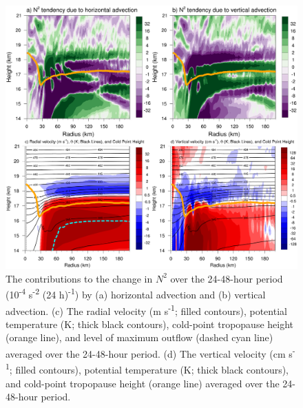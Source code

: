 \documentclass{ametsoc}
\begin{document}
\begin{figure}[ht]
\centerline{\includegraphics[width=39pc]{h024-h048-adv.png}}
\caption{The contributions to the change in $N^2$ over the 24-48-hour period (10\textsuperscript{-4} s\textsuperscript{-2} (24 h)\textsuperscript{-1}) by (a) horizontal advection and (b) vertical advection. (c) The radial velocity (m s\textsuperscript{-1}; filled contours), potential temperature (K; thick black contours), cold-point tropopause height (orange line), and level of maximum outflow (dashed cyan line) averaged over the 24-48-hour period. (d) The vertical velocity (cm s\textsuperscript{-1}; filled contours), potential temperature (K; thick black contours), and cold-point tropopause height (orange line) averaged over the 24-48-hour period.}
\label{fig:adv-24-48}
\end{figure}
\end{document}
